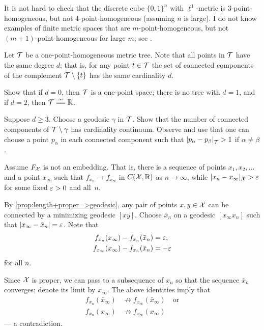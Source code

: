 It is not hard to check that the discrete cube $\{0,1\}^n$ with $\ell^1$-metric is $3$-point-homogeneous, but not $4$-point-homogeneous (assuming $n$ is large).
I do not know examples of finite metric spaces that are $m$-point-homogeneous, but not $(m+1)$-point-homogeneous for large $m$;
see \cite{petrunin-2022-MO-homogeneous}.



Let $\mathcal{T}$ be a one-point-homogeneous metric tree.
Note that all points in $\mathcal{T}$ have the same degree $d$;
that is, for any point $t\in \mathcal{T}$ the set of connected components of the complement $\mathcal{T}\setminus\{t\}$ has the same cardinality $d$.

Show that if $d=0$, then $\mathcal{T}$ is a one-point space;
there is no tree with $d=1$,
and if $d=2$, then $\spc{T}\iso\RR$.

Suppose $d\ge 3$.
Choose a geodesic $\gamma$ in $\mathcal{T}$.
Show that the number of connected components of $\mathcal{T}\setminus\gamma$ has cardinality continuum.
Observe and use that one can choose a point $p_\alpha$ in each connected component such that $\dist{p_\alpha}{p_\beta}{\spc{T}}>1$ if $\alpha\ne\beta$.

Assume $F_{\mathcal{X}}$ is not an embedding.
That is, there is a sequence of points $x_1,x_2,\dots$ 
and a point $x_\infty$ such that $f_{x_n}\to f_{x_\infty}$ in $C(\mathcal{X},\mathbb{R})$
as $n\to \infty$, 
while $|x_n-x_\infty|_{\mathcal{X}}>\varepsilon$ 
for some fixed $\varepsilon>0$ and all~$n$.

By \ref{prop:length+proper=>geodesic}, any pair of points $x,y\in \mathcal{X}$ can be connected by a minimizing geodesic $[xy]$.
Choose $\bar x_n$ on a geodesic $[x_\infty x_n]$ such that $|x_\infty-\bar x_n|=\varepsilon$.
Note that 
\begin{align*}
f_{x_n}(x_\infty)-f_{x_n}(\bar x_n)&=\varepsilon,
\\
f_{x_\infty}(x_\infty)-f_{x_n}(\bar x_n)&=-\varepsilon
\end{align*}
for all $n$.

Since $\mathcal{X}$ is proper, we can pass to a subsequence of $x_n$ so that the sequence  $\bar x_n$ converges;
denote its limit by $\bar x_\infty$.
The above identities imply that
\begin{align*}
f_{x_n}(\bar x_\infty)&\not\to f_{x_\infty}(\bar x_\infty)
\quad
\text{or}
\\
f_{x_n}(x_\infty)&\not\to f_{x_\infty}( x_\infty)
\end{align*}
--- a contradiction.

